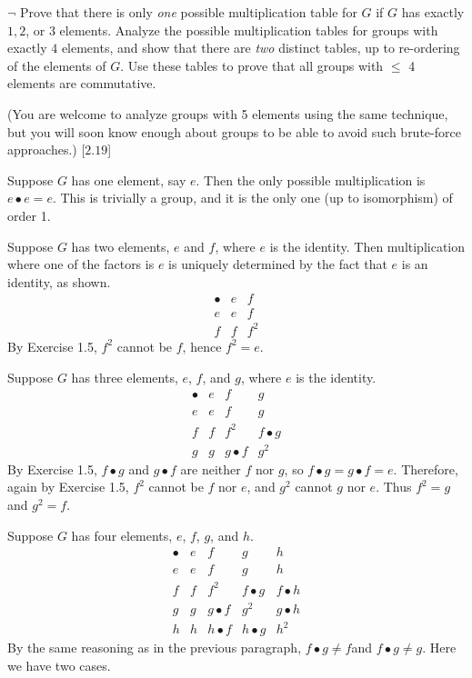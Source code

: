\begin{exercise}
	$\neg$ Prove that there is only \emph{one} possible multiplication table for $G$ if $G$ has exactly $1,2$, or $3$ elements. Analyze the possible multiplication tables for groups with exactly $4$ elements, and show that there are \emph{two} distinct tables, up to re-ordering of the elements of $G$. Use these tables to prove that all groups with $\leq$ 4 elements are commutative.
	
	(You are welcome to analyze groups with 5 elements using the same technique, but you will soon know enough about groups to be able to avoid such brute-force approaches.) [$2.19$]
\end{exercise}
\begin{solution}
	Suppose $G$ has one element, say $e$. Then the only possible multiplication is $e\bullet e = e$. This is trivially a group, and it is the only one (up to isomorphism) of order 1.
	
	Suppose $G$ has two elements, $e$ and $f$, where $e$ is the identity. Then multiplication where one of the factors is $e$ is uniquely determined by the fact that $e$ is an identity, as shown.
	{%
		\renewcommand{\arraystretch}{1.5}
		\[
		\begin{array}{c||c|c}
			\bullet & e & f\\
			\hline
			\hline
			e & e & f \\
			\hline
			f & f & f^2
		\end{array}
		\]
	}
	By Exercise 1.5, $f^2$ cannot be $f$, hence $f^2 = e$.
	
	Suppose $G$ has three elements, $e$, $f$, and $g$, where $e$ is the identity. 
	{%
		\renewcommand{\arraystretch}{1.5}
		\[
		\begin{array}{c||c|c|c}
			\bullet & e & f & g\\
			\hline
			\hline
			e & e & f & g\\
			\hline
			f & f & f^2 & f\bullet g\\
			\hline
			g & g & g\bullet f & g^2
		\end{array}
		\]
	}
	By Exercise 1.5, $f\bullet g$ and $g\bullet f$ are neither $f$ nor $g$, so $f\bullet g = g\bullet f = e$. Therefore, again by Exercise 1.5, $f^2$ cannot be $f$ nor $e$, and $g^2$ cannot $g$ nor $e$. Thus $f^2 = g$ and $g^2 = f$.
	
	Suppose $G$ has four elements, $e$, $f$, $g$, and $h$.
	{%
		\renewcommand{\arraystretch}{1.5}
		\[
		\begin{array}{c||c|c|c|c}
			\bullet & e & f & g & h\\
			\hline
			\hline
			e & e & f & g & h\\
			\hline
			f & f & f^2 & f\bullet g & f\bullet h\\
			\hline
			g & g & g\bullet f & g^2 & g\bullet h\\
			\hline
			h & h & h \bullet f & h\bullet g & h^2
		\end{array}
		\]
	}
	By the same reasoning as in the previous paragraph, $f\bullet g \neq f $and $f\bullet g\neq g$. Here we have two cases.

\end{solution}
